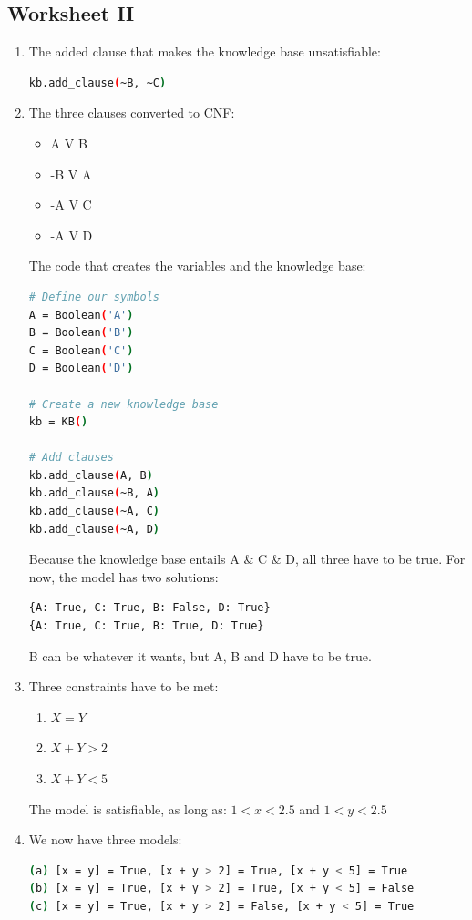 \documentclass[a4paper,11pt]{article}
\begin{document}
\subsection{Worksheet II}
\begin{enumerate}
\item The added clause that makes the knowledge base unsatisfiable:
\begin{lstlisting}[language=bash]
kb.add_clause(~B, ~C)
\end{lstlisting}

\item The three clauses converted to CNF:
\begin{itemize}
\item A V B
\item -B V A
\item -A V C
\item -A V D
\end{itemize}
The code that creates the variables and the knowledge base:
\begin{lstlisting}[language=bash]
# Define our symbols
A = Boolean('A')
B = Boolean('B')
C = Boolean('C')
D = Boolean('D')

# Create a new knowledge base
kb = KB()

# Add clauses
kb.add_clause(A, B)
kb.add_clause(~B, A)
kb.add_clause(~A, C)
kb.add_clause(~A, D)
\end{lstlisting}
Because the knowledge base entails A \& C \& D, all three have to be true. For now, the model has two solutions:
\begin{lstlisting}[language=bash]
{A: True, C: True, B: False, D: True}
{A: True, C: True, B: True, D: True}
\end{lstlisting}
B can be whatever it wants, but A, B and D have to be true.

\item Three constraints have to be met:
\begin{enumerate}[I]
\item $X = Y$
\item $X + Y > 2$
\item $X + Y < 5$
\end{enumerate}
The model is satisfiable, as long as: 
$1 < x < 2.5$ and $1 < y < 2.5$

\item We now have three models:
\begin{lstlisting}[language=bash]
(a) [x = y] = True, [x + y > 2] = True, [x + y < 5] = True
(b) [x = y] = True, [x + y > 2] = True, [x + y < 5] = False
(c) [x = y] = True, [x + y > 2] = False, [x + y < 5] = True
\end{lstlisting}


\end{enumerate}
\end{document}
